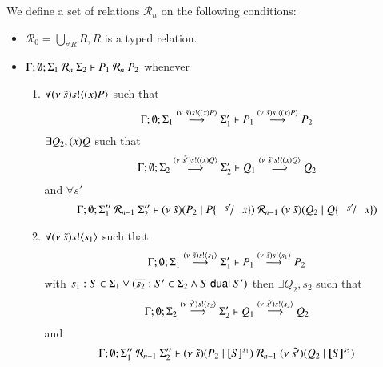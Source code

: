 \begin{definition}\rm
	We define a set of relations $\mathcal{R}_n$
	on the following conditions:
%
	\begin{itemize}
		\item	$\mathcal{R}_0 = \bigcup_{\forall R} R, R$ is a typed relation.
		\item	$\Gamma; \emptyset; \Sigma_1\ \mathcal{R}_n\ \Sigma_2 \proves P_1\ \mathcal{R}_n\ P_2$
			whenever
			\begin{enumerate}
				\item	$\forall (\nu\ \tilde{s}) s ! \langle (x)P \rangle$ such that
					\[
						\Gamma; \emptyset; \Sigma_1 \stackrel{(\nu\ \tilde{s}) s ! \langle (x)P \rangle}{\longrightarrow} \Sigma_1' \vdash P_1 \stackrel{(\nu\ \tilde{s}) s ! \langle (x)P \rangle}{\longrightarrow} P_2
					\]
					$\exists Q_2, (x)Q$ such that
					\[
						\Gamma; \emptyset; \Sigma_2 \stackrel{(\nu\ \tilde{s'}) s ! \langle (x)Q \rangle}{\Longrightarrow} \Sigma_2' \vdash Q_1 \stackrel{(\nu\ \tilde{s}) s ! \langle (x)Q \rangle}{\Longrightarrow} Q_2
					\]
					and $\forall s'$
					\[
						\Gamma; \emptyset; \Sigma_1''\ \mathcal{R}_{n-1}\ \Sigma_2'' \proves
						\newsp{\tilde{s}}{P_2 \Par P \subst{s'}{x}}\ \mathcal{R}_{n-1}\  \newsp{\tilde{s}}{Q_2 \Par Q \subst{s'}{x}}
					\]

				\item	$\forall (\nu\ \tilde{s}) s ! \langle s_1 \rangle$ such that
					\[
						\Gamma; \emptyset; \Sigma_1 \stackrel{(\nu\ \tilde{s}) s ! \langle s_1 \rangle}{\longrightarrow} \Sigma_1' \vdash P_1 \stackrel{(\nu\ \tilde{s}) s ! \langle s_1 \rangle}{\longrightarrow} P_2
					\]
					with $s_1: S \in \Sigma_1 \vee (\overline{s_2}: S' \in \Sigma_2 \wedge S \ \mathsf{dual}\  S')$
					then $\exists Q_2, s_2$ such that
					\[
						\Gamma; \emptyset; \Sigma_2 \stackrel{(\nu\ \tilde{s'}) s ! \langle s_2 \rangle}{\Longrightarrow} \Sigma_2' \vdash Q_1 \stackrel{(\nu\ \tilde{s'}) s ! \langle s_2 \rangle}{\Longrightarrow} Q_2
					\]
					and
					\[
						\Gamma; \emptyset; \Sigma_1''\ \mathcal{R}_{n-1}\ \Sigma_2'' \proves \newsp{\tilde{s}}{P_2 \Par \map{S}^{s_1}}\ \mathcal{R}_{n-1}\ 
						\newsp{\tilde{s'}}{Q_2 \Par \map{S}^{s_2}}
					\]



\end{enumerate}
\end{itemize}
\end{definition}
